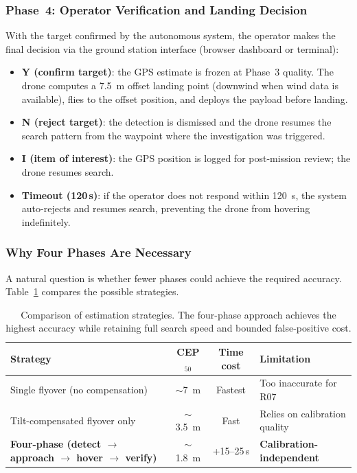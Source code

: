 \subsubsection{Phase~4: Operator Verification and Landing Decision}

With the target confirmed by the autonomous system, the operator makes the final decision via the ground station interface (browser dashboard or terminal):

\begin{itemize}
  \item \textbf{Y (confirm target)}: the GPS estimate is frozen at Phase~3 quality.  The drone computes a \SI{7.5}{\metre} offset landing point (downwind when wind data is available), flies to the offset position, and deploys the payload before landing.
  \item \textbf{N (reject target)}: the detection is dismissed and the drone resumes the search pattern from the waypoint where the investigation was triggered.
  \item \textbf{I (item of interest)}: the GPS position is logged for post-mission review; the drone resumes search.
  \item \textbf{Timeout (120\,s)}: if the operator does not respond within \SI{120}{\second}, the system auto-rejects and resumes search, preventing the drone from hovering indefinitely.
\end{itemize}

\subsubsection{Why Four Phases Are Necessary}

A natural question is whether fewer phases could achieve the required accuracy.  Table~\ref{tab:two-step-comparison} compares the possible strategies.

\begin{table}[ht]
  \centering
  \caption{Comparison of estimation strategies.  The four-phase approach achieves the highest accuracy while retaining full search speed and bounded false-positive cost.}
  \label{tab:two-step-comparison}
  \begin{tabular}{lccl}
    \toprule
    \textbf{Strategy} & \textbf{CEP$_{50}$} & \textbf{Time cost} & \textbf{Limitation} \\
    \midrule
    Single flyover (no compensation) & $\sim$\SI{7}{\metre} & Fastest & Too inaccurate for R07 \\
    Tilt-compensated flyover only    & $\sim$\SI{3.5}{\metre} & Fast & Relies on calibration quality \\
    \textbf{Four-phase (detect $\to$ approach $\to$ hover $\to$ verify)} & $\sim$\SI{1.8}{\metre} & +15--25\,s & \textbf{Calibration-independent} \\
    \bottomrule
  \end{tabular}
\end{table}

